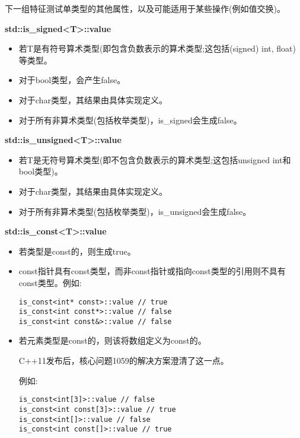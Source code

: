 
下一组特征测试单类型的其他属性，以及可能适用于某些操作(例如值交换)。


\textbf{std::is\_signed<T>::value}

\begin{itemize}
\item 
若T是有符号算术类型(即包含负数表示的算术类型;这包括(signed) int, float)等类型。

\item 
对于bool类型，会产生false。

\item 
对于char类型，其结果由具体实现定义。

\item 
对于所有非算术类型(包括枚举类型)，is\_signed会生成false。
\end{itemize}

\textbf{std::is\_unsigned<T>::value}

\begin{itemize}
\item 
若T是无符号算术类型(即不包含负数表示的算术类型;这包括unsigned int和bool类型)。

\item 
对于char类型，其结果由具体实现定义。

\item 
对于所有非算术类型(包括枚举类型)，is\_unsigned会生成false。
\end{itemize}

\textbf{std::is\_const<T>::value}

\begin{itemize}
\item 
若类型是const的，则生成true。

\item 
const指针具有const类型，而非const指针或指向const类型的引用则不具有const类型。例如:
\begin{lstlisting}[style=styleCXX]
is_const<int* const>::value // true
is_const<int const*>::value // false
is_const<int const&>::value // false
\end{lstlisting}

\item 
若元素类型是const的，则该将数组定义为const的。

\begin{tcolorbox}[colback=webgreen!5!white,colframe=webgreen!75!black]
\hspace*{0.75cm}C++11发布后，核心问题1059的解决方案澄清了这一点。
\end{tcolorbox}

例如:
\begin{lstlisting}[style=styleCXX]
is_const<int[3]>::value // false
is_const<int const[3]>::value // true
is_const<int[]>::value // false
is_const<int const[]>::value // true
\end{lstlisting}

\end{itemize}

